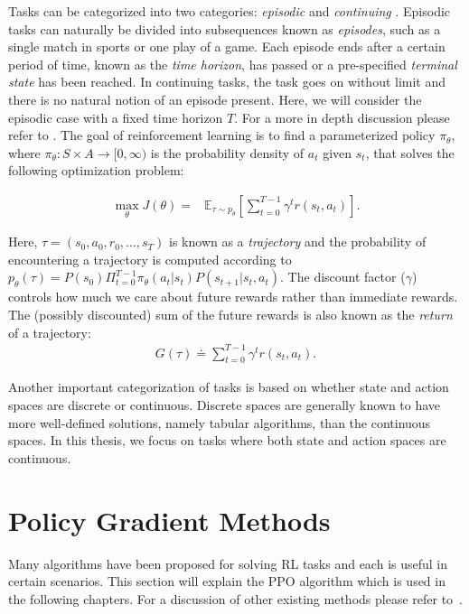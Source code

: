 Tasks can be categorized into two categories: \textit{episodic} and \textit{continuing} \cite{rlbook}. Episodic tasks can naturally be divided into subsequences known as \textit{episodes}, such as a single match in sports or one play of a game. Each episode ends after a certain period of time, known as the \textit{time horizon}, has passed or a pre-specified \textit{terminal state} has been reached. In continuing tasks, the task goes on without limit and there is no natural notion of an episode present. Here, we will consider the episodic case with a fixed time horizon $T$. For a more in depth discussion please refer to \cite{rlbook}. The goal of reinforcement learning is to find a parameterized policy $\pi_\theta$, where $\pi_\theta: S \times A \to [0, \infty)$ is the probability density of $a_t$ given $s_t$, that solves the following optimization problem:

\begin{align}
\label{eq:return}
\mathop{\mathrm{max}}_\theta J(\theta) = &\mathbb{E}_{\tau\sim p_\theta}\left[\sum_{t=0}^{T-1}\gamma^t{r({s}_t, {a}_t)} \right].
\end{align}

Here, $\tau = (s_0, a_0, r_0, \dots, s_T)$ is known as a \textit{trajectory} and the probability of encountering a trajectory is computed according to $p_\theta(\tau) = P(s_0) \Pi_{t=0}^{T-1} \pi_\theta(a_t|s_t) P(s_{t+1}|s_t,a_t)$. The discount factor ($\gamma$) controls how much we care about future rewards rather than immediate rewards. The (possibly discounted) sum of the future rewards is also known as the \textit{return} of a trajectory:
\begin{align*}
    G(\tau) \doteq \sum_{t=0}^{T-1}\gamma^t{r({s}_t, {a}_t)}.
\end{align*}

Another important categorization of tasks is based on whether state and action spaces are discrete or continuous. Discrete spaces are generally known to have more well-defined solutions, namely tabular algorithms, than the continuous spaces. In this thesis, we focus on tasks where both state and action spaces are continuous.

\section{Policy Gradient Methods}
\label{sec:background_pg}

Many algorithms have been proposed for solving \ac{RL} tasks and each is useful in certain scenarios. This section will explain the \ac{PPO} algorithm which is used in the following chapters. For a discussion of other existing methods please refer to~\cite{rl_survey}.

